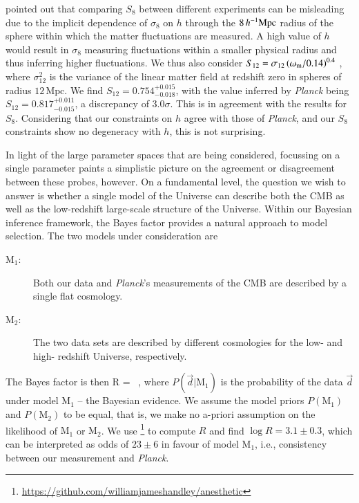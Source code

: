 \citet{Sanchez2020} pointed out that comparing $S_{8}$ between different experiments can be misleading due to the implicit dependence of $\sigma_{8}$ on $h$ through the $8\,h^{-1}{\rm Mpc}$ radius of the sphere within which the matter fluctuations are measured. 
A high value of $h$ would result in $\sigma_{8}$ measuring fluctuations within a smaller physical radius and thus inferring higher fluctuations. 
We thus also consider $S_{12} = \sigma_{12}\left(\omega_{\rm m}/0.14\right)^{0.4}$ \citep{Sanchez2020}, where $\sigma_{12}^{2}$ is the variance of the linear matter field at redshift zero in spheres of radius $12\,\mathrm{Mpc}$.
We find $S_{12} = 0.754^{+0.015}_{-0.018}$, with the value inferred by {\it Planck} being $S_{12} = 0.817_{-0.015}^{+0.011}
$, a discrepancy of $3.0\sigma$. 
This is in agreement with the results for $S_{8}$. 
Considering that our \tttp constraints on $h$ agree with those of {\it Planck}, and our $S_{8}$ constraints show no degeneracy with $h$, this is not surprising.

In light of the large parameter spaces that are being considered, focussing on a single parameter paints a simplistic picture on the agreement or disagreement between these probes, however. 
On a fundamental level, the question we wish to answer is whether a single model of the Universe can describe both the CMB as well as the low-redshift large-scale structure of the Universe.
Within our Bayesian inference framework, the Bayes factor provides a natural approach to model selection. 
The two models under consideration are 
\begin{description}
	\item[$\mathrm{M}_1$:] Both our \tttp data and {\it Planck}'s measurements of the CMB are described by a single flat \LCDM cosmology.
	\item[$\mathrm{M}_2$:] The two data sets are described by different cosmologies for the low- and high- redshift Universe, respectively.
\end{description}
The Bayes factor is then
\be
\label{equ:bayes-factor}
	R =  \ ,
\ee
where $P(\vec d | \mathrm{M}_1)$ is the probability of the data $\vec d$ under model $\mathrm{M}_1$ -- the Bayesian evidence. 
We assume the model priors $P(\mathrm{M}_1)$ and $P(\mathrm{M}_2)$ to be equal, that is, we make no a-priori assumption on the likelihood of $\mathrm{M}_1$ or $\mathrm{M}_2$. 
We use \footnote{\url{https://github.com/williamjameshandley/anesthetic}}\citep{anesthetic} to compute $R$ and find $\log R=3.1\pm0.3$, which can be interpreted as odds of $23\pm6$ in favour of model $\mathrm{M}_1$, i.e., consistency between our \tttp measurement and {\it Planck}. 

